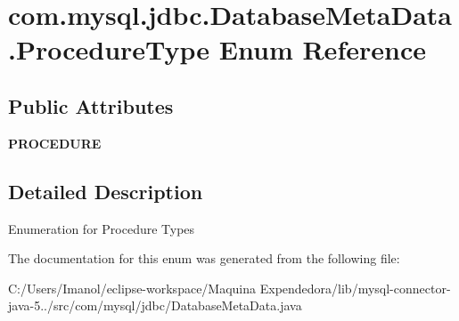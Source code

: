\hypertarget{enumcom_1_1mysql_1_1jdbc_1_1_database_meta_data_1_1_procedure_type}{}\section{com.\+mysql.\+jdbc.\+Database\+Meta\+Data.\+Procedure\+Type Enum Reference}
\label{enumcom_1_1mysql_1_1jdbc_1_1_database_meta_data_1_1_procedure_type}
\subsection*{Public Attributes}
\begin{DoxyCompactItemize}
\item 
\mbox{\label{enumcom_1_1mysql_1_1jdbc_1_1_database_meta_data_1_1_procedure_type_a9e5b0f6c137cdf407335ad2dd23a80cb}} 
{\bfseries P\+R\+O\+C\+E\+D\+U\+RE}
\end{DoxyCompactItemize}


\subsection{Detailed Description}
Enumeration for Procedure Types 

The documentation for this enum was generated from the following file\+:\begin{DoxyCompactItemize}
\item 
C\+:/\+Users/\+Imanol/eclipse-\/workspace/\+Maquina Expendedora/lib/mysql-\/connector-\/java-\/5../src/com/mysql/jdbc/Database\+Meta\+Data.\+java\end{DoxyCompactItemize}
